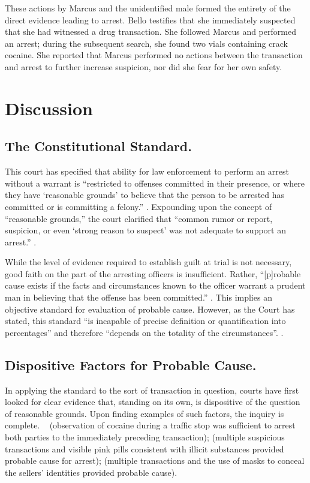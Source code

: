 \documentclass[12pt]{lawmemo}
\begin{document}
These actions by Marcus and the unidentified male formed the entirety of the
direct evidence leading to arrest.  Bello testifies that she immediately
suspected that she had witnessed a drug transaction.  She followed Marcus and
performed an arrest; during the subsequent search, she found two vials
containing crack cocaine.  She reported that Marcus performed no actions
between the transaction and arrest to further increase suspicion, nor did she
fear for her own safety.  

\section{Discussion} 

\subsection{The Constitutional Standard.} This court has specified that ability
for law enforcement to perform an arrest without a warrant is ``restricted to
offenses committed in their presence, or where they have `reasonable grounds'
to believe that the person to be arrested has committed or is committing a
felony.'' . Expounding upon the concept of ``reasonable
grounds,'' the court clarified that ``common rumor or report, suspicion, or
even ‘strong reason to suspect’ was not adequate to support an arrest.''
.

While the level of evidence required to establish guilt at trial is not
necessary, good faith on the part of the arresting officers is insufficient.
Rather, ``[p]robable cause exists if the facts and circumstances known to the
officer warrant a prudent man in believing that the offense has been
committed.'' . This implies an objective standard for
evaluation of probable cause.  However, as the Court has stated, this standard
``is incapable of precise definition or quantification into percentages'' and
therefore ``depends on the totality of the circumstances''. .

\subsection{Dispositive Factors for Probable Cause.} In applying the standard to
the sort of transaction in question, courts have first looked for clear
evidence that, standing on its own, is dispositive of the question of reasonable
grounds.  Upon finding examples of such factors, the inquiry is complete.
\Seeeg~\cite{Castro} (observation of cocaine during a traffic
stop was sufficient to arrest both parties to the immediately preceding
transaction); \cite{Davis} (multiple suspicious transactions and visible pink
pills consistent with illicit substances provided probable cause for arrest);
\cite{Darling} (multiple transactions and the use of masks to conceal the
sellers' identities provided probable cause).
\end{document}
